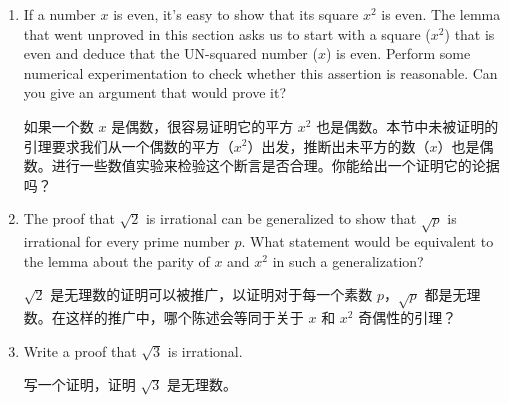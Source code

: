 \begin{enumerate}
    
    \workbookpagebreak
    \hintspagebreak
    
    \item If a number $x$ is even, it's easy to show that its square $x^2$
    is even. The lemma that went unproved in this section asks us to
    start with a square ($x^2$) that is even and deduce that the UN-squared
    number ($x$) is even. Perform some numerical experimentation to
    check whether this assertion is reasonable.  Can you give an argument
    that would prove it?
    
    如果一个数 $x$ 是偶数，很容易证明它的平方 $x^2$ 也是偶数。本节中未被证明的引理要求我们从一个偶数的平方（$x^2$）出发，推断出未平方的数（$x$）也是偶数。进行一些数值实验来检验这个断言是否合理。你能给出一个证明它的论据吗？
    \vfill
    
    
    \vfill
    
    \item The proof that $\sqrt{2}$ is irrational can be generalized 
    to show that $\sqrt{p}$ is irrational for every prime number $p$. What statement would be equivalent to the lemma about the parity
    of $x$ and $x^2$ in such a generalization?
    
    $\sqrt{2}$ 是无理数的证明可以被推广，以证明对于每一个素数 $p$，$\sqrt{p}$ 都是无理数。在这样的推广中，哪个陈述会等同于关于 $x$ 和 $x^2$ 奇偶性的引理？
    \vfill
    
    
    \vfill
    
    \workbookpagebreak
    
    \item Write a proof that $\sqrt{3}$ is irrational.
    
    写一个证明，证明 $\sqrt{3}$ 是无理数。
    \vfill
    
    
    \vfill
    
    
    \end{enumerate}